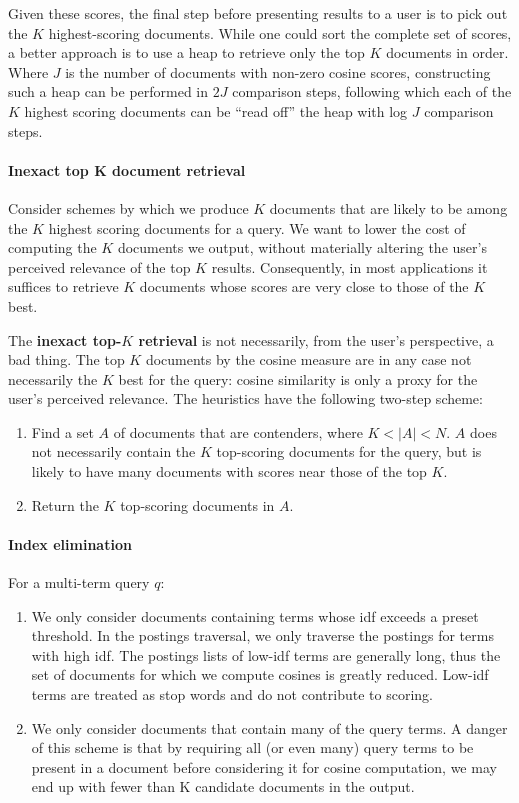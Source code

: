 \documentclass[letterpaper,11pt]{article}
\begin{document}
Given these scores, the final step before presenting results to a user is to pick out the $K$ highest-scoring documents. While one could sort the complete set of scores, a better approach is to use a heap to retrieve only the top $K$ documents in order. Where $J$ is the number of documents with non-zero cosine scores, constructing such a heap can be performed in $2J$ comparison steps, following which each of the $K$ highest scoring documents can be “read off” the heap with log $J$ comparison steps.

\paragraph{Inexact top K document retrieval}
Consider schemes by which we produce $K$ documents that are likely to be among the $K$ highest scoring documents for a query. We want to lower the cost of computing the $K$ documents we output, without materially altering the user’s perceived relevance of the top $K$ results. Consequently, in most applications it suffices to retrieve $K$ documents whose scores are very close to those of the $K$ best.

The \textbf{inexact top-$K$ retrieval} is not necessarily, from the user’s perspective, a bad thing. The top $K$ documents by the cosine measure are in any case not necessarily the $K$ best for the query: cosine similarity is only a proxy for the user’s perceived relevance. The heuristics have the following two-step scheme:
\begin{enumerate}
    \item Find a set $A$ of documents that are contenders, where $K < |A| < N$. $A$ does not necessarily contain the $K$ top-scoring documents for the query, but is likely to have many documents with scores near those of the top $K$.
    \item Return the $K$ top-scoring documents in $A$.
\end{enumerate}

\paragraph{Index elimination}
For a multi-term query $q$:
\begin{enumerate}
    \item We only consider documents containing terms whose idf exceeds a preset threshold. In the postings traversal, we only traverse the postings for terms with high idf. The postings lists of low-idf terms are generally long, thus the set of documents for which we compute cosines is greatly reduced. Low-idf terms are treated as stop words and do not contribute to scoring.
    \item We only consider documents that contain many of the query terms. A danger of this scheme is that by requiring all (or even many) query terms to be present in a document before considering it for cosine computation, we may end up with fewer than K candidate documents in the output.
\end{enumerate}
\end{document}

